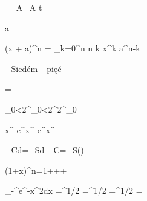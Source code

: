 
\startformula
   \  \ \dot A \ {\bi\dot A \check t} 
  \   
  \ \mathbf{\acute \imath}
\stopformula

\startformula
  \langle a \rangle \left\langle {} \right\rangle
   \left\langle {} \right\rangle
\stopformula

\startformula
  (x + a)^n = \sum_{k=0}^n {n \choose k} x^k a^{n-k}
\stopformula

\startformula
 _{\rm Siedém}
  _{\rm pięć}
\stopformula

\startformula
  =
\stopformula

\startformula
 \aleph_{0}<2^{\aleph_0}<2^{2^{\aleph_0}}
\stopformula

\startformula
x^{\alpha} e^{\beta x^{\gamma} e^{\delta x^{\epsilon}}}
\stopformula

\startformula
 \oint_C\cdot d=\int_S\mathbf{\nabla}\times{}\cdot d\qquad
 \oint_C\cdot{}=\iint_S(\nabla\times{})\,
\stopformula

\startformula
 (1+x)^n=1+++\cdots
\stopformula

\startformula
\startmathalignment
 \int_{-\infty}^\infty e^{-x^2}dx \NC =\NC  {}^{1/2} \NR
 \NC =\NC {}^{1/2}\NR
 \NC =\NC {}^{1/2}\NR
 \NC =\NC \sqrt{\pi}
\stopmathalignment
\stopformula

\endinput